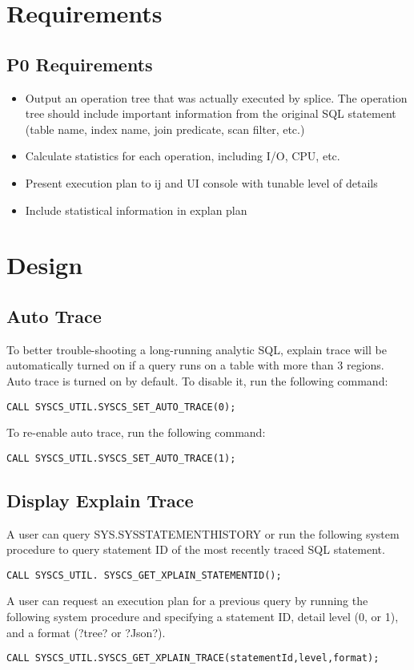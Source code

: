 \documentclass{article}
\begin{document}
\section{Requirements}
\subsection{P0 Requirements}
\begin{itemize}
  \item Output an operation tree that was actually executed by splice. The operation tree should include important information from the original SQL statement (table name, index name, join predicate, scan filter, etc.)
  \item Calculate statistics for each operation, including I/O, CPU, etc.
  \item Present execution plan to ij and UI console with tunable level of details
  \item Include statistical information in explan plan
\end{itemize}

\section{Design}
\subsection{Auto Trace}
To better trouble-shooting a long-running analytic SQL, explain trace will be automatically turned on if a query runs on a table with more than 3 regions. Auto trace is turned on by default. To disable it, run the following command:

\begin{lstlisting}
CALL SYSCS_UTIL.SYSCS_SET_AUTO_TRACE(0);
\end{lstlisting}
\noindent
To re-enable auto trace, run the following command:
\begin{lstlisting}
CALL SYSCS_UTIL.SYSCS_SET_AUTO_TRACE(1);
\end{lstlisting}
\subsection{Display Explain Trace}
A user can query SYS.SYSSTATEMENTHISTORY or run the following system procedure to query statement ID of the most recently traced SQL statement.
\begin{lstlisting}
CALL SYSCS_UTIL. SYSCS_GET_XPLAIN_STATEMENTID();
\end{lstlisting}
A user can request an execution plan for a previous query by running the following system procedure and specifying a statement ID, detail level (0, or 1), and a format (?tree? or ?Json?).
\begin{lstlisting}
CALL SYSCS_UTIL.SYSCS_GET_XPLAIN_TRACE(statementId,level,format);
\end{lstlisting}
\end{document}
